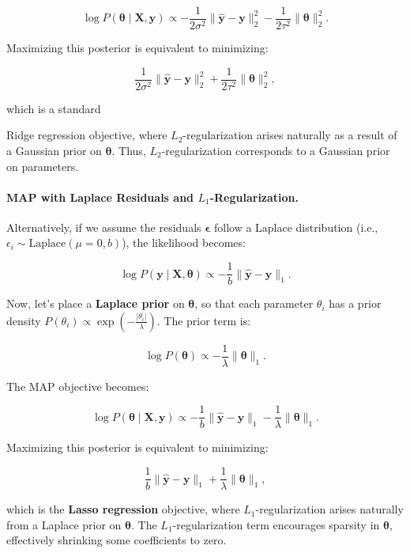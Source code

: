     \[
    \log P(\bm{\theta} \mid \bm{X}, \bm{y}) \propto -\frac{1}{2\sigma^2} \|\hat{\bm{y}} - \bm{y}\|_2^2 - \frac{1}{2\tau^2} \|\bm{\theta}\|_2^2.
    \]
    
    Maximizing this posterior is equivalent to minimizing:
    
    \[
    \frac{1}{2\sigma^2} \|\hat{\bm{y}} - \bm{y}\|_2^2 + \frac{1}{2\tau^2} \|\bm{\theta}\|_2^2,
    \]
    
    which is a standard {Ridge regression objective, where \( L_2 \)-regularization arises naturally as a result of a Gaussian prior on \( \bm{\theta} \). Thus, \( L_2 \)-regularization corresponds to a Gaussian prior on parameters.
    
    \paragraph{MAP with Laplace Residuals and \( L_1 \)-Regularization.}
    
    Alternatively, if we assume the residuals \( \bm{\epsilon} \) follow a Laplace distribution (i.e., \( \epsilon_i \sim \text{Laplace}(\mu = 0, b) \)), the likelihood becomes:
    
    \[
    \log P(\bm{y} \mid \bm{X}, \bm{\theta}) \propto -\frac{1}{b} \|\hat{\bm{y}} - \bm{y}\|_1.
    \]
    
    Now, let’s place a \textbf{Laplace prior} on \( \bm{\theta} \), so that each parameter \( \theta_i \) has a prior density \( P(\theta_i) \propto \exp\left(-\frac{|\theta_i|}{\lambda}\right) \). The prior term is:
    
    \[
    \log P(\bm{\theta}) \propto -\frac{1}{\lambda} \|\bm{\theta}\|_1.
    \]
    
    The MAP objective becomes:
    
    \[
    \log P(\bm{\theta} \mid \bm{X}, \bm{y}) \propto -\frac{1}{b} \|\hat{\bm{y}} - \bm{y}\|_1 - \frac{1}{\lambda} \|\bm{\theta}\|_1.
    \]
    
    Maximizing this posterior is equivalent to minimizing:
    
    \[
    \frac{1}{b} \|\hat{\bm{y}} - \bm{y}\|_1 + \frac{1}{\lambda} \|\bm{\theta}\|_1,
    \]
    
    which is the \textbf{Lasso regression} objective, where \( L_1 \)-regularization arises naturally from a Laplace prior on \( \bm{\theta} \). The \( L_1 \)-regularization term encourages sparsity in \( \bm{\theta} \), effectively shrinking some coefficients to zero.
    
}

